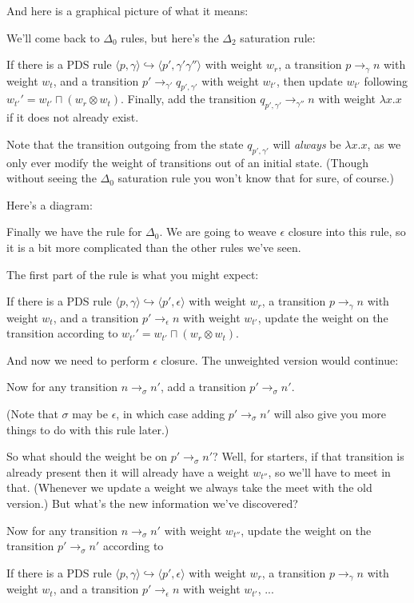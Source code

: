\documentclass{article}
\newcommand{\Config}[2]{\ensuremath{\langle #1, #2 \rangle}}
\newcommand{\Rule}[2]{\ensuremath{#1 \hookrightarrow #2}}
\newcommand{\Trans}[3]{\ensuremath{#1 \rightarrow_{#2} #3}}
\newcommand{\meet}{\sqcap}
\newcommand{\extend}{\otimes}
\begin{document}
And here is a graphical picture of what it means:


We'll come back to $\Delta_0$ rules, but here's the $\Delta_2$
saturation rule:

   If there is a PDS rule
   \Rule{\Config{p}{\gamma}}{\Config{p'}{\gamma'\gamma''}} with weight
   $w_r$, a transition \Trans{p}{\gamma}{n} with weight $w_t$, and a
   transition \Trans{p'}{\gamma'}{q_{p',\gamma'}} with weight
   $w_{t'}$, then update $w_{t'}$ following $w_{t'}' = w_{t'} \meet
   (w_r \extend w_t)$. Finally, add the transition
   \Trans{q_{p',\gamma'}}{\gamma''}{n} with weight $\lambda x.x$ if it
   does not already exist.

Note that the transition outgoing from the state $q_{p',\gamma'}$ will
\emph{always} be $\lambda x. x$, as we only ever modify the weight of
transitions out of an initial state. (Though without seeing the
$\Delta_0$ saturation rule you won't know that for sure, of course.)

Here's a diagram:


Finally we have the rule for $\Delta_0$. We are going to weave
$\epsilon$ closure into this rule, so it is a bit more complicated
than the other rules we've seen.

The first part of the rule is what you might expect:

   If there is a PDS rule
   \Rule{\Config{p}{\gamma}}{\Config{p'}{\epsilon}} with weight $w_r$,
   a transition \Trans{p}{\gamma}{n} with weight $w_t$, and a
   transition \Trans{p'}{\epsilon}{n} with weight $w_{t'}$, update the
   weight on the transition according to $w_{t'}' = w_{t'} \meet (w_r
   \extend w_t)$.

And now we need to perform $\epsilon$ closure. The unweighted version
would continue:

   Now for any transition \Trans{n}{\sigma}{n'}, add a transition
   \Trans{p'}{\sigma}{n'}.

(Note that $\sigma$ may be $\epsilon$, in which case adding
\Trans{p'}{\sigma}{n'} will also give you more things to do with
this rule later.)

So what should the weight be on \Trans{p'}{\sigma}{n'}? Well, for
starters, if that transition is already present then it will already
have a weight $w_{t''}$, so we'll have to meet in that. (Whenever we
update a weight we always take the meet with the old version.) But
what's the new information we've discovered?

   Now for any transition \Trans{n}{\sigma}{n'} with weight $w_{t''}$,
   update the weight on the transition \Trans{p'}{\sigma}{n'}
   according to 





   If there is a PDS rule
   \Rule{\Config{p}{\gamma}}{\Config{p'}{\epsilon}} with weight $w_r$,
   a transition \Trans{p}{\gamma}{n} with weight $w_t$, and a
   transition \Trans{p'}{\epsilon}{n} with weight $w_{t'}$, ...
\end{document}
